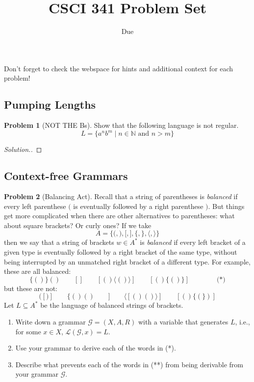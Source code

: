 \documentclass[11pt]{article}
\title{CSCI 341 Problem Set \pset}
\author{\subtitle}
\date{Due
    \duedate
}
\theoremstyle{theorem} %
\theoremstyle{definition} %
\newtheorem{problem}                    {{\color{BurntOrange}Problem}}
\theoremstyle{remark} %
\begin{document}
\maketitle

Don't forget to check the webspace for hints and additional context for each problem!

\subsection*{Pumping Lengths}

\begin{problem}
    [NOT THE Bs]
    Show that the following language is not regular. 
    \[
        L = \{a^nb^m \mid n \in \mathbb N \text{ and } n > m\}
    \]
\end{problem}

\begin{proof}[Solution.]
    
\end{proof}

\subsection*{Context-free Grammars}

\begin{problem}
    [Balancing Act]
    Recall that a string of parentheses is \emph{balanced} if every left parenthese \(\mathtt{(}\) is eventually followed by a right parenthese \(\mathtt{)}\). 
    But things get more complicated when there are other alternatives to parentheses: what about square brackets? Or curly ones?
    If we take \[
        A = \big\{ \mathtt{(}, \mathtt{)}, \mathtt{[}, \mathtt{]}, \mathtt{\{}, \mathtt{\}}, \mathtt{\langle}, \mathtt{\rangle}  \big\}
    \]
    then we say that a string of brackets \(w \in A^*\) is \emph{balanced} if every left bracket of a given type is eventually followed by a right bracket of the same type, without being interrupted by an unmatched right bracket of a different type. 
    For example, these are all balanced:
    \[
        \mathtt{ 
            \{()\}()
            \qquad
            [] 
            \qquad
            [()\langle()\rangle] 
            \qquad
            [()\{()\}] 
        }
        \hspace{4em}\text{(*)}
    \]
    but these are not: 
    \[
        \mathtt{ 
            ([)] \qquad
            \{()()
            \qquad
            ] 
            \qquad
            \langle[()()\rangle] 
            \qquad
            [()\{(\})] 
        }
    \]
    Let \(L \subseteq A^*\) be the language of balanced strings of brackets.
    \begin{enumerate}
        \item Write down a grammar \(\mathcal G = (X, A, R)\) with a variable that generates \(L\), i.e., for some \(x \in X\), \(\mathcal L(\mathcal G, x) = L\).
        \item Use your grammar to derive each of the words in (*).
        \item Describe what prevents each of the words in (**) from being derivable from your grammar \(\mathcal G\).
    \end{enumerate}
\end{problem}
\end{document}

